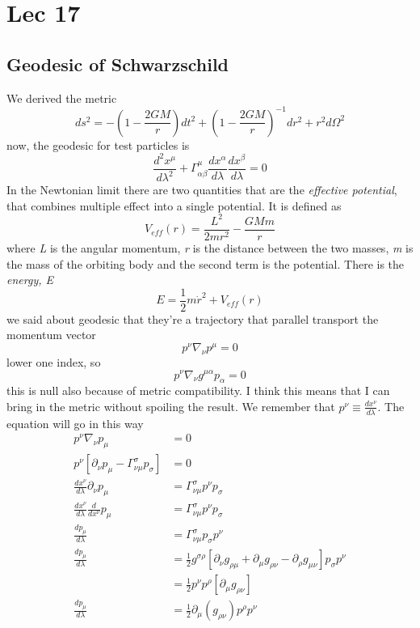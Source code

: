 \section{Lec 17}
\subsection{Geodesic of Schwarzschild}
We derived the metric 
\[
ds^{2} = - \left( 1- \frac{2GM}{r} \right)dt^{2} + \left( 1- \frac{2GM}{r} \right)^{-1}dr^{2} + r^{2} d\Omega ^{2}
\]
now, the geodesic for test particles is
\[
\frac{d^{2} x^{\mu }}{d \lambda ^{2}} + \Gamma ^{\mu }_{\alpha \beta } \frac{d x^{\alpha }}{d \lambda }\frac{d x^{\beta }}{d \lambda } = 0
\]
In the Newtonian limit there are two quantities that are the \emph{effective potential}, that combines multiple effect into a single potential. It is defined as
\[
V_{eff}\left( r \right) = \frac{L^{2}}{2mr^{2}} - \frac{GMm}{r}
\]
where \emph{L} is the angular momentum, \emph{r} is the distance between the two masses, \emph{m} is the mass of the orbiting body and the second term is the potential.
There is the \emph{energy, E}
\[
	E = \frac{1}{2}m\dot{r}^{2} + V_{eff}\left( r \right)
\]
we said about geodesic that they're a trajectory that parallel transport  the momentum vector
\[
p^{\nu }\nabla _{\nu }p^{\mu } = 0
\]
lower one index, so
\[
p^{\nu }\nabla _{\nu }g^{\mu \alpha } p_{\alpha  } = 0
\]
this is null also because of metric compatibility. I think this means that I can bring in the metric without spoiling the result. We remember that $p^{\nu } \equiv \frac{d x^{\nu }}{d \lambda }$.
The equation will go in this way
\begin{align}
	p^{\nu }\nabla _{\nu }p_{\mu } &= 0 \nonumber \\
	p^{\nu }\left[ \partial_{\nu }p_{\mu } - \Gamma ^{\sigma }_{\nu \mu }p_{\sigma } \right] & = 0 \nonumber \\
	\frac{d x^{\nu }}{d \lambda } \partial_{\nu }p_{\mu } &= \Gamma ^{\sigma }_{\nu \mu }p^{\nu }p_{\sigma } \nonumber \\
	\frac{d x^{\nu }}{d \lambda }\frac{d }{d x^{ \nu }}p_{\mu } & = \Gamma ^{\sigma }_{\nu \mu }p^{\nu }p_{\sigma } \nonumber\\
	\frac{d p_{\mu }}{d \lambda } &= \Gamma ^{\sigma }_{\nu \mu } p_{\sigma }p^{\nu } \nonumber\\
	\frac{d p_{\mu }}{d \lambda } &= \frac{1}{2}g^{\sigma \rho } \left[ \partial_{\nu }g_{\rho \mu } + \partial_{\mu }g_{\rho \nu } - \partial_{\rho }g_{\mu \nu } \right] p_{\sigma }p^{\nu } \nonumber \\
				      &= \frac{1}{2} p^{\nu }p^{\rho } \left[ \partial_{\mu }g_{\rho \nu } \right] \nonumber \\
				     \frac{d p_{\mu }}{d \lambda } &= \frac{1}{2} \partial_{\mu }\left( g_{\rho \nu } \right) p^{\rho }p^{\nu } \\
\end{align}
